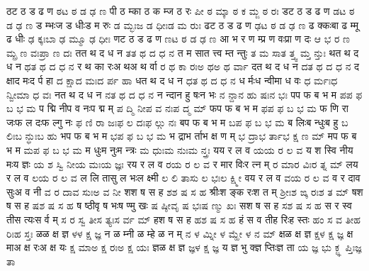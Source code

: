 \documentclass{article}
\begin{document}
\card
{ठ}{ट ठ ड ढ ण}%
{ಠ}{ಟ ಠ ಡ ಢ ಣ}
{{पी ठ म्}{का ठ क म्}{ज ठ रः}}%
{{ಪೀ ಠ ಮ್}{ಕಾ ಠ ಕ ಮ್}{ಜ ಠ ರಃ}}
\card
{ड}{ट ठ ड ढ ण}%
{ಡ}{ಟ ಠ ಡ ಢ ಣ}
{{ड म्भः}{ज ड धीः}{ड म रुः}}%
{{ಡ ಮ್ಭಃ}{ಜ ಡ ಧೀಃ}{ಡ ಮ ರುಃ}}
\card
{ढ}{ट ठ ड ढ ण}%
{ಢ}{ಟ ಠ ಡ ಢ ಣ}
{{ढ क्कः}{बा ढ म्}{मू ढ धीः}}%
{{ಢ ಕ್ಕಃ}{ಬಾ ಢ ಮ್}{ಮೂ ಢ ಧೀಃ}}
\card
{ण}{ट ठ ड ढ ण}%
{ಣ}{ಟ ಠ ಡ ಢ ಣ}
{{आ भ र ण म्}{प्र ण वः}{प्रा ण दः}}%
{{ಆ ಭ ರ ಣ ಮ್}{ಪ್ರ ಣ ವಃ}{ಪ್ರಾ ಣ ದಃ}}
\card
{त}{त थ द ध न}%
{ತ}{ತ ಥ ದ ಧ ನ}
{{त म सा}{त त्त्व म्}{त न्तुः}}%
{{ತ ಮ ಸಾ}{ತ ತ್ತ್ವ ಮ್}{ತ ನ್ತುಃ}}
\card
{थ}{त थ द ध न}%
{ಥ}{ತ ಥ ದ ಧ ನ}
{{र थ का रः}{अ थ}{अ थ र्वा}}%
{{ರ ಥ ಕಾ ರಃ}{ಅ ಥ}{ಅ ಥ ರ್ವಾ}}
\card
{द}{त थ द ध न}%
{ದ}{ತ ಥ ದ ಧ ನ}
{{द क्षा}{द मः}{द र्प हा}}%
{{ದ ಕ್ಷಾ}{ದ ಮಃ}{ದ ರ್ಪ ಹಾ}}
\card
{ध}{त थ द ध न}%
{ಧ}{ತ ಥ ದ ಧ ನ}
{{ध र्मः}{ध न्वी}{मा ध वः}}%
{{ಧ ರ್ಮಃ}{ಧ ನ್ವೀ}{ಮಾ ಧ ವಃ}}
\card
{न}{त थ द ध न}%
{ನ}{ತ ಥ ದ ಧ ನ}
{{न न्दा}{न हु षः}{न भः}}%
{{ನ ನ್ದಾ}{ನ ಹು ಷಃ}{ನ ಭಃ}}
\card
{प}{प फ ब भ म}%
{ಪ}{ಪ ಫ ಬ ಭ ಮ}
{{प द्मि नी}{प व नः}{प द्म म्}}%
{{ಪ ದ್ಮಿ ನೀ}{ಪ ವ ನಃ}{ಪ ದ್ಮ ಮ್}}
\card
{फ}{प फ ब भ म}%
{ಫ}{ಪ ಫ ಬ ಭ ಮ}
{{फ णि रा जः}{फ ल दः}{फ ल्गु नः}}%
{{ಫ ಣಿ ರಾ ಜಃ}{ಫ ಲ ದಃ}{ಫ ಲ್ಗು ನಃ}}
\card
{ब}{प फ ब भ म}%
{ಬ}{ಪ ಫ ಬ ಭ ಮ}
{{ब लिः}{ब न्धुः}{ब हु}}%
{{ಬ ಲಿಃ}{ಬ ನ್ಧುಃ}{ಬ ಹು}}
\card
{भ}{प फ ब भ म}%
{ಭ}{ಪ ಫ ಬ ಭ ಮ}
{{भ द्रा}{भ र्ता}{भ क्ष ण म्}}%
{{ಭ ದ್ರಾ}{ಭ ರ್ತಾ}{ಭ ಕ್ಷ ಣ ಮ್}}
\card
{म}{प फ ब भ म}%
{ಮ}{ಪ ಫ ಬ ಭ ಮ}
{{म धुः}{म नुः}{म न्त्रः}}%
{{ಮ ಧುಃ}{ಮ ನುಃ}{ಮ ನ್ತ್ರಃ}}
\card
{य}{य र ल व}%
{ಯ}{ಯ ರ ಲ ವ}
{{य श स्वि नी}{य मः}{य ज्ञः}}%
{{ಯ ಶ ಸ್ವಿ ನೀ}{ಯ ಮಃ}{ಯ ಜ್ಞಃ}}
\card
{र}{य र ल व}%
{ರ}{ಯ ರ ಲ ವ}
{{र मा}{र विः}{र त्न म्}}%
{{ರ ಮಾ}{ರ ವಿಃ}{ರ ತ್ನ ಮ್}}
\card
{ल}{य र ल व}%
{ಲ}{ಯ ರ ಲ ವ}
{{ल लि ता}{सु ल भः}{ल क्ष्मी}}%
{{ಲ ಲಿ ತಾ}{ಸು ಲ ಭಃ}{ಲ ಕ್ಷ್ಮೀ}}
\card
{व}{य र ल व}%
{ವ}{ಯ ರ ಲ ವ}
{{व र दा}{व सुः}{अ व नी}}%
{{ವ ರ ದಾ}{ವ ಸುಃ}{ಅ ವ ನೀ}}
\card
{श}{श ष स ह}%
{ಶ}{ಶ ಷ ಸ ಹ}
{{श्रीः}{श ङ्क रः}{श त म्}}%
{{ಶ್ರೀಃ}{ಶ ಙ್ಕ ರಃ}{ಶ ತ ಮ್}}
\card
{ष}{श ष स ह}%
{ಷ}{ಶ ಷ ಸ ಹ}
{{ष ष्ठी}{वृ ष भः}{ष ण्मु खः}}%
{{ಷ ಷ್ಠೀ}{ವೃ ಷ ಭಃ}{ಷ ಣ್ಮು ಖಃ}}
\card
{स}{श ष स ह}%
{ಸ}{ಶ ಷ ಸ ಹ}
{{स र स्व ती}{स त्यः}{स र्व म्}}%
{{ಸ ರ ಸ್ವ ತೀ}{ಸ ತ್ಯಃ}{ಸ ರ್ವ ಮ್}}
\card
{ह}{श ष स ह}%
{ಹ}{ಶ ಷ ಸ ಹ}
{{हं स व ती}{ह रिः}{ह स्तः}}%
{{ಹಂ ಸ ವ ತೀ}{ಹ ರಿಃ}{ಹ ಸ್ತಃ}}
\card
{ळ}{ळ क्ष ज्ञ}%
{ಳ}{ಳ ಕ್ಷ ಜ್ಞ}
{{न ळ म्}{नी ळ म्}{हे ळ न म्}}%
{{ನ ಳ ಮ್}{ನೀ ಳ ಮ್}{ಹೇ ಳ ನ ಮ್}}
\card
{क्ष}{ळ क्ष ज्ञ}%
{ಕ್ಷ}{ಳ ಕ್ಷ ಜ್ಞ}
{{क्ष मा}{अ क्ष रः}{अ क्ष यः}}%
{{ಕ್ಷ ಮಾ}{ಅ ಕ್ಷ ರಃ}{ಅ ಕ್ಷ ಯಃ}}
\card
{ज्ञ}{ळ क्ष ज्ञ}%
{ಜ್ಞ}{ಳ ಕ್ಷ ಜ್ಞ}
{{य ज्ञ भु क्}{ज्ञ प्तिः}{ज्ञ ता}}%
{{ಯ ಜ್ಞ ಭು ಕ್}{ಜ್ಞ ಪ್ತಿಃ}{ಜ್ಞ ತಾ}}
\end{document}
